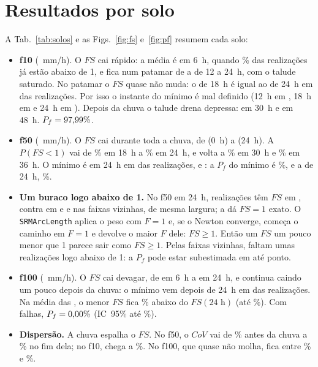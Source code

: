 \documentclass[11pt,a4paper]{article}
\begin{document}
\section{Resultados por solo}\label{sec:solos}
A Tab.~\ref{tab:solos} e as Figs.~\ref{fig:fs} e~\ref{fig:pf} resumem cada solo:
\begin{itemize}
\item \textbf{f10} (\IDez~mm/h). O $FS$ cai rápido: a média é \MediaDezSeis{} em 6~h, quando \PfDezSeis\% das
realizações já estão abaixo de 1, e fica num patamar de \MediaDezDoze{} a \MediaDezVinteQuatro{} de 12 a 24~h, com o
talude saturado. No patamar o $FS$ quase não muda: o de 18~h é igual ao de 24~h em \PatamarIgual{} das \NDez{}
realizações. Por isso o instante do mínimo é mal definido (12~h em \QuandoDezDoze, 18~h em \QuandoDezDezoito{} e 24~h
em \QuandoDezVinteQuatro). Depois da chuva o talude drena depressa: \MediaDezTrinta{} em 30~h e \MediaDezQuarentaOito{}
em 48~h. $P_f = 97{,}99\%$.
\item \textbf{f50} (\ICinquenta~mm/h). O $FS$ cai durante toda a chuva, de \MediaCinquentaZero{} (0~h) a
\MediaCinquentaVinteQuatro{} (24~h). A $P(FS < 1)$ vai de \PfCinquentaDezoito\% em 18~h a \PfCinquentaVinteQuatro\% em
24~h, e volta a \PfCinquentaTrinta\% em 30~h e \PfCinquentaTrintaSeis\% em 36~h. O mínimo é em 24~h em
\QuandoCinquentaVinteQuatro{} das \NCinquenta{} realizações, e \FalhaForaFraseCinquenta: a $P_f$ do mínimo é
\PfMinCinquenta\%, e a de 24~h, \PfCinquentaVinteQuatro\%.
\item \textbf{Um buraco logo abaixo de 1.} No f50 em 24~h, \BuracoAbaixo{} realizações têm $FS$ em \BuracoFaixaAbaixo,
contra \BuracoAcima{} em \BuracoFaixaAcima{} e \BuracoVizAbaixo{} e \BuracoVizAcima{} nas faixas vizinhas, de mesma
largura; a \BuracoExato{} dá $FS = 1$ exato. O \texttt{SRMArcLength} aplica o peso com $F = 1$ e, se o Newton converge,
começa o caminho em $F = 1$ e devolve o maior $F$ dele: $FS \geq 1$. Então um $FS$ um pouco menor que 1 parece sair como
$FS \geq 1$. Pelas faixas vizinhas, faltam umas \BuracoFalta{} realizações logo abaixo de 1: a $P_f$ pode estar
subestimada em até \BuracoPontos{} ponto.
\item \textbf{f100} (\ICem~mm/h). O $FS$ cai devagar, de \MediaCemSeis{} em 6~h a \MediaCemVinteQuatro{} em 24~h, e
continua caindo um pouco depois da chuva: o mínimo vem depois de 24~h em \DepoisCem{} das \NCem{} realizações. Na média
das \NCem, o menor $FS$ fica \AbaixoMediaCem\% abaixo do $FS(24\text{ h})$ (até \AbaixoMaxCem\%). Com \NfMinCem{}
falhas, $P_f = 0{,}00\%$ (IC~95\% até \HiMinCem\%).
\item \textbf{Dispersão.} A chuva espalha o $FS$. No f50, o $CoV$ vai de \CovCinquentaZero\% antes da chuva a
\CovCinquentaVinteQuatro\% no fim dela; no f10, chega a \CovFaixaMaxDez\%. No f100, que quase não molha, fica entre
\CovFaixaMinCem\% e \CovFaixaMaxCem\%.
\end{itemize}
\end{document}
